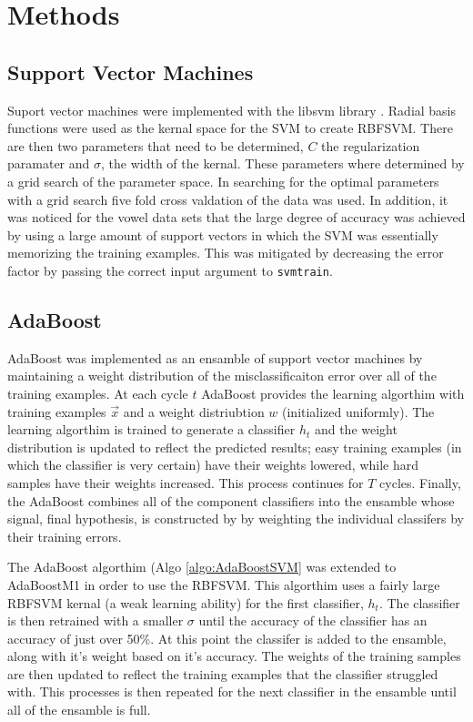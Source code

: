 \section{Methods}
\label{sec:Methods}

\subsection{Support Vector Machines}

Suport vector machines were implemented with the libsvm library \cite{chang_libsvm:_2011}.
Radial basis functions were used as the kernal space for the SVM to create RBFSVM.
There are then two parameters that need to be determined, $C$ the regularization paramater and $\sigma$, the width of the kernal.
These parameters where determined by a grid search of the parameter space.
In searching for the optimal parameters with a grid search five fold cross valdation of the data was used.
In addition, it was noticed for the vowel data sets that the large degree of accuracy was achieved by using a large amount of support vectors in which the SVM was essentially memorizing the training examples.
This was mitigated by decreasing the error factor by passing the correct input argument to \verb+svmtrain+.

\subsection{AdaBoost}

AdaBoost was implemented as an ensamble of support vector machines by maintaining a weight distribution of the misclassificaiton error over all of the training examples.
At each cycle $t$ AdaBoost provides the learning algorthim with training examples $\vec{x}$ and a weight distriubtion $w$ (initialized uniformly).
The learning algorthim is trained to generate a classifier $h_t$ and the weight distribution is updated to reflect the predicted results; easy training examples (in which the classifier is very certain) have their weights lowered, while hard samples have their weights increased.
This process continues for $T$ cycles.
Finally, the AdaBoost combines all of the component classifiers into the ensamble whose signal, final hypothesis, is constructed by by weighting the individual classifers by their training errors.

The AdaBoost algorthim (Algo \ref{algo:AdaBoostSVM} was extended to AdaBoostM1 in order to use the RBFSVM.
This algorthim uses a fairly large RBFSVM kernal (a weak learning ability) for the first classifier, $h_t$.
The classifier is then retrained with a smaller $\sigma$ until the accuracy of the classifier has an accuracy of just over 50\%.
At this point the classifer is added to the ensamble, along with it's weight based on it's accuracy.
The weights of the training samples are then updated to reflect the training examples that the classifier struggled with.
This processes is then repeated for the next classifier in the ensamble until all of the ensamble is full.

